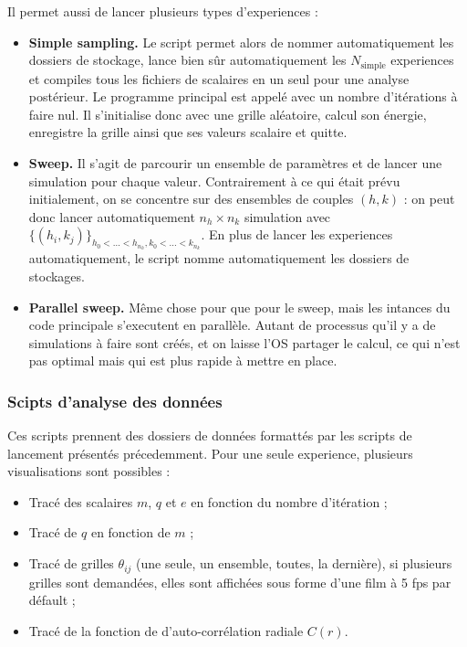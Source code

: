 \documentclass[a4paper, 11pt]{article}
\begin{document}
Il permet aussi de lancer plusieurs types d'experiences :
\begin{itemize}
    \item \textbf{Simple sampling.} Le script permet alors de nommer automatiquement les dossiers de
        stockage, lance bien sûr automatiquement les $N_\text{simple}$ experiences et compiles tous
        les fichiers de scalaires en un seul pour une analyse postérieur. Le programme principal est
        appelé avec un nombre d'itérations à faire nul. Il s'initialise donc avec une grille
        aléatoire, calcul son énergie, enregistre la grille ainsi que ses valeurs scalaire et
        quitte.
    \item \textbf{Sweep.} Il s'agit de parcourir un ensemble de paramètres et de lancer une
        simulation pour chaque valeur. Contrairement à ce qui était prévu initialement, on se
        concentre sur des ensembles de couples $(h, k)$ : on peut donc lancer automatiquement 
        $n_h\times n_k$ simulation avec $\{(h_i, k_j)\}_{h_0 < \hdots < h_{n_h}, k_0 < \hdots < k_{n_k}}$.
        En plus de lancer les experiences automatiquement, le script nomme automatiquement les
        dossiers de stockages. 
    \item \textbf{Parallel sweep.} Même chose pour que pour le sweep, mais les intances du code
        principale s'executent en parallèle. Autant de processus qu'il y a de simulations à faire
        sont créés, et on laisse l'OS partager le calcul, ce qui n'est pas optimal mais qui est plus
        rapide à mettre en place. 
\end{itemize}


\subsubsection{Scipts d'analyse des données}

Ces scripts prennent des dossiers de données formattés par les scripts de lancement présentés
précedemment. Pour une seule experience, plusieurs visualisations sont possibles :
\begin{itemize}
    \item Tracé des scalaires $m$, $q$ et $e$ en fonction du nombre d'itération ;
    \item Tracé de $q$ en fonction de $m$ ;
    \item Tracé de grilles $\theta_{ij}$ (une seule, un ensemble, toutes, la dernière), si
        plusieurs grilles sont demandées, elles sont affichées sous forme d'une film à 5 fps par
        défault ;
    \item Tracé de la fonction de d'auto-corrélation radiale $C(r)$.
\end{itemize}
\end{document}
